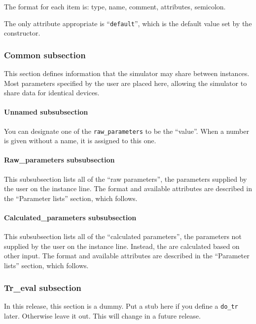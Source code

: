 The format for each item is: type, name, comment, attributes, semicolon.

The only attribute appropriate is ``{\tt default}'', which is the
default value set by the constructor.
\subsubsection{Common subsection}

This section defines information that the simulator may share between
instances.  Most parameters specified by the user are placed here,
allowing the simulator to share data for identical devices.

\paragraph{Unnamed subsubsection}

You can designate one of the {\tt raw\_parameters} to be the
``value''.  When a number is given without a name, it is assigned to
this one.

\paragraph{Raw\_parameters subsubsection}

This subsubsection lists all of the ``raw parameters'', the parameters
supplied by the user on the instance line.  The format and available
attributes are described in the ``Parameter lists'' section, which
follows.

\paragraph{Calculated\_parameters subsubsection}

This subsubsection lists all of the ``calculated parameters'', the
parameters not supplied by the user on the instance line.  Instead,
the are calculated based on other input.  The format and available
attributes are described in the ``Parameter lists'' section, which
follows.
\subsubsection{Tr\_eval subsection}

In this release, this section is a dummy.  Put a stub here if you
define a {\tt do\_tr} later.  Otherwise leave it out.  This will change
in a future release.
